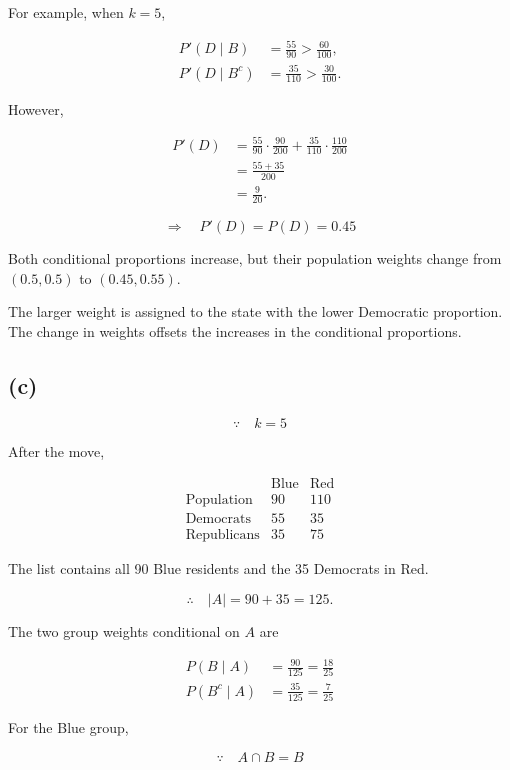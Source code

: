 \documentclass[11pt,a4paper]{article}
\begin{document}
For example, when $k=5$,

\[
\begin{aligned}
P'(D\mid B)
&=\frac{55}{90}
>\frac{60}{100},\\[4pt]
P'(D\mid B^c)
&=\frac{35}{110}
>\frac{30}{100}.
\end{aligned}
\]

However,

\[
\begin{aligned}
P'(D)
&=\frac{55}{90}\cdot\frac{90}{200}
 +\frac{35}{110}\cdot\frac{110}{200}\\
&=\frac{55+35}{200}\\
&=\frac9{20}.
\end{aligned}
\]

\[
\Longrightarrow\quad
P'(D)=P(D)=0.45
\]

Both conditional proportions increase, but
their population weights change from
$(0.5,0.5)$ to $(0.45,0.55)$.

The larger weight is assigned to the state
with the lower Democratic proportion.
The change in weights offsets the increases
in the conditional proportions.

\subsection*{(c)}

\[
\because\quad k=5
\]

After the move,

\[
\begin{array}{c|cc}
&\text{Blue}&\text{Red}\\ \hline
\text{Population}&90&110\\
\text{Democrats}&55&35\\
\text{Republicans}&35&75
\end{array}
\]

The list contains all 90 Blue residents
and the 35 Democrats in Red.

\[
\therefore\quad |A|=90+35=125.
\]

The two group weights conditional on $A$ are

\[
\begin{aligned}
P(B\mid A)
&=\frac{90}{125}
=\frac{18}{25}\\[6pt]
P(B^c\mid A)
&=\frac{35}{125}
=\frac7{25}
\end{aligned}
\]

For the Blue group,

\[
\because\quad
A\cap B=B
\]
\end{document}
